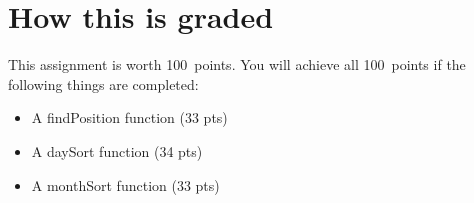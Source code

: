 \documentclass{article}
\newcommand{\AValue}{100}
\begin{document}
\section*{How this is graded}
This assignment is worth \AValue \ points. You will achieve all \AValue \   points if the following things are completed:
\begin{itemize}
    \item A findPosition function (33 pts)
    \item A daySort function (34 pts)
    \item A monthSort function (33 pts)
\end{itemize}
\end{document}
